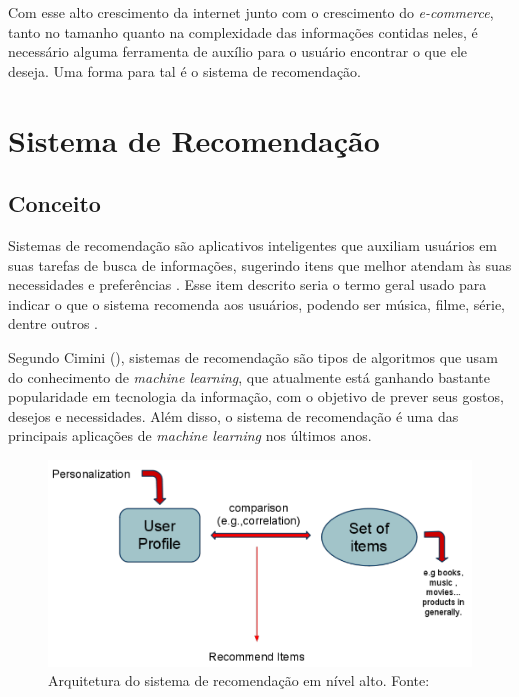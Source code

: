 Com esse alto crescimento da internet junto com o crescimento do \textit{e-commerce}, tanto no tamanho quanto na complexidade das informações contidas neles, é necessário alguma ferramenta de auxílio para o usuário encontrar o que ele deseja. Uma forma para tal é o sistema de recomendação.

\section{Sistema de Recomendação}

\subsection{Conceito}

Sistemas de recomendação são aplicativos inteligentes que auxiliam usuários em suas tarefas de busca de informações, sugerindo itens que melhor atendam às suas necessidades e preferências \cite{Mahmood:2009:IRS:1557914.1557930}. Esse item descrito seria o termo geral usado para indicar o que o sistema recomenda aos usuários, podendo ser música, filme, série, dentre outros \cite{Ricci:2010}.

Segundo Cimini (\citeyear{Cimini:2019}), sistemas de recomendação são tipos de algoritmos que usam do conhecimento de \textit{machine learning}, que atualmente está ganhando bastante popularidade em tecnologia da informação, com o objetivo de prever seus gostos, desejos e necessidades. Além disso, o sistema de recomendação é uma das principais aplicações de \textit{machine learning} nos últimos anos.

\begin{figure}[H]
    \centering
    \includegraphics[scale=0.35]{figuras/referencial_teorico/sr_arquitetura.png}
    \caption[Arquitetura do sistema de recomendação em nível alto ]{Arquitetura do sistema de recomendação em nível alto. Fonte: \cite{Stefanos:2008}}
    \label{fig:sr_arquitetura}
\end{figure}

